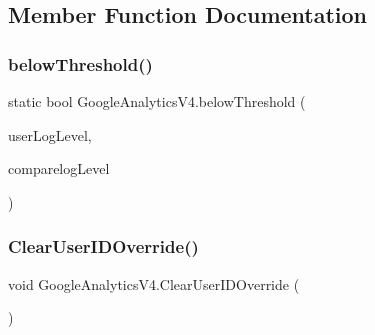 \subsection{Member Function Documentation}
\mbox{\label{class_google_analytics_v4_a2636156a1842ec77c486978a3d33d39e}} 
\subsubsection{\texorpdfstring{below\+Threshold()}{belowThreshold()}}
{\footnotesize\ttfamily static bool Google\+Analytics\+V4.\+below\+Threshold (\begin{DoxyParamCaption}\item[{\hyperlink{class_google_analytics_v4_a53191bc619081f5781932db905fbf30d}{Google\+Analytics\+V4.\+Debug\+Mode}}]{user\+Log\+Level,  }\item[{\hyperlink{class_google_analytics_v4_a53191bc619081f5781932db905fbf30d}{Google\+Analytics\+V4.\+Debug\+Mode}}]{comparelog\+Level }\end{DoxyParamCaption})\hspace{0.3cm}{\ttfamily [static]}}

\mbox{\label{class_google_analytics_v4_addf9e233891152323b0ea5062fd8cace}} 
\subsubsection{\texorpdfstring{Clear\+User\+I\+D\+Override()}{ClearUserIDOverride()}}
{\footnotesize\ttfamily void Google\+Analytics\+V4.\+Clear\+User\+I\+D\+Override (\begin{DoxyParamCaption}{ }\end{DoxyParamCaption})}

\mbox{\label{class_google_analytics_v4_a3adbcab13c9826a5b887f481cd174a94}} 
